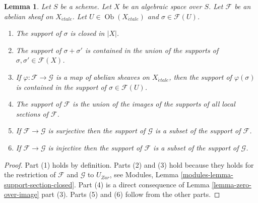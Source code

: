 \documentclass[10pt,a4paper]{amsart}
\theoremstyle{plain}
\newtheorem{lemma}[subsection]{Lemma}
\theoremstyle{definition}
\theoremstyle{remark}
\numberwithin{equation}{subsection}
\def\Ob{\mathop{\mathrm{Ob}}\nolimits}
\def\etale{{\acute{e}tale}}
\begin{document}
\begin{lemma}
\label{lemma-support-section-closed}
Let $S$ be a scheme.
Let $X$ be an algebraic space over $S$.
Let $\mathcal{F}$ be an abelian sheaf on $X_\etale$.
Let $U \in \Ob(X_\etale)$ and $\sigma \in \mathcal{F}(U)$.
\begin{enumerate}
\item The support of $\sigma$ is closed in $|X|$.
\item The support of $\sigma + \sigma'$ is contained in the union of
the supports of $\sigma, \sigma' \in \mathcal{F}(X)$.
\item If $\varphi : \mathcal{F} \to \mathcal{G}$ is a map of
abelian sheaves on $X_\etale$, then the support of $\varphi(\sigma)$ is
contained in the support of $\sigma \in \mathcal{F}(U)$.
\item The support of $\mathcal{F}$ is the union of the images of the
supports of all local sections of $\mathcal{F}$.
\item If $\mathcal{F} \to \mathcal{G}$ is surjective then the support
of $\mathcal{G}$ is a subset of the support of $\mathcal{F}$.
\item If $\mathcal{F} \to \mathcal{G}$ is injective then the support
of $\mathcal{F}$ is a subset of the support of $\mathcal{G}$.
\end{enumerate}
\end{lemma}

\begin{proof}
Part (1) holds by definition.
Parts (2) and (3) hold because they holds for the restriction of
$\mathcal{F}$ and $\mathcal{G}$ to $U_{Zar}$, see
Modules, Lemma \ref{modules-lemma-support-section-closed}.
Part (4) is a direct consequence of
Lemma \ref{lemma-zero-over-image} part (3).
Parts (5) and (6) follow from the other parts.
\end{proof}
\end{document}
